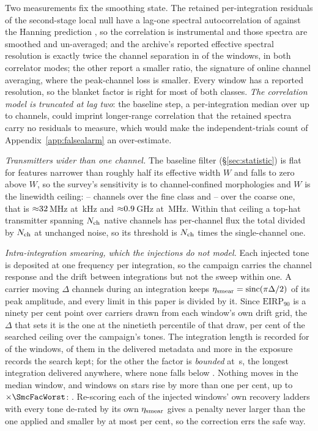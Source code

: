 Two measurements fix the smoothing state. The retained per-integration
residuals of the second-stage local null have a lag-one spectral
autocorrelation of \LNLagOne{} against the Hanning prediction \HanRhoOne, so
the correlation is instrumental and those spectra are smoothed and
un-averaged; and the archive's reported effective spectral resolution is
exactly twice the channel separation in \NHanTwo{} of the \NHanKnown{}
windows, in both correlator modes; the other \NHanOther{} report a smaller
ratio, the signature of online channel averaging, where the peak-channel loss
is smaller. Every window has a reported resolution, so the blanket
factor is right for most of both classes. \emph{The correlation model is truncated at
lag two}: the baseline step, a per-integration median over up to \MedWin{}
channels, could imprint longer-range correlation that the retained spectra
carry no residuals to measure, which would make the independent-trials count
of Appendix~\ref{app:falsealarm} an over-estimate.

\emph{Transmitters wider than one channel.} The baseline filter
(\S\ref{sec:statistic}) is flat for features narrower than roughly half its
effective width $W$ and falls to zero above $W$, so the survey's sensitivity
is to channel-confined morphologies and $W$ is the linewidth ceiling:
\MedWinFineLo--\MedWinFineHi{} channels over the fine class and
\MedWinCoarseLo--\MedWinCoarseHi{} over the coarse one, that is
${\approx}32$\,MHz at \ChanFineKHz\,kHz and
${\approx}0.9$\,GHz at \ChanCoarseMHz\,MHz. Within that
ceiling a top-hat transmitter spanning $N_{\rm ch}$ native channels has
per-channel flux the total divided by $N_{\rm ch}$ at unchanged noise, so
its threshold is $N_{\rm ch}$ times the single-channel one.

\emph{Intra-integration smearing, which the injections do not model.} Each
injected tone is deposited at one frequency per integration, so the campaign
carries the channel response and the drift between integrations but not the
sweep within one. A carrier moving $\Delta$ channels during an integration
keeps $\eta_{\rm smear}=\mathrm{sinc}(\pi\Delta/2)$ of its peak amplitude, and
every limit in this paper is divided by it. Since
$\mathrm{EIRP}_{90}$ is a ninety per cent point over carriers drawn from each
window's own drift grid, the $\Delta$ that sets it is the one at the ninetieth
percentile of that draw, \SmcQninePct{} per cent of the searched ceiling over
the campaign's \SmcNTone{} tones. The integration length is recorded for
\SmcNMeas{} of the \NWindows{} windows, \CsNDumpWin{} of them in the delivered
metadata and \SmNRecov{} more in the exposure records the search kept; for the
other \SmcNBound{} the factor is \emph{bounded} at \SmcDtCeil\,s, the longest
integration delivered anywhere, where none falls below \SmcBoundEta.
Nothing moves in the median window,
and \SmcNAbove{} windows on \SmcNAboveStar{} stars rise by more than one per cent,
up to $\times\SmcFacWorst$: \SmcAboveStars. Re-scoring each of the
\SmcValNWin{} injected windows' own recovery ladders with every tone de-rated
by its own $\eta_{\rm smear}$ gives a penalty never larger than the one
applied and smaller by at most \SmcValWorstPct{} per cent, so the correction
errs the safe way.

